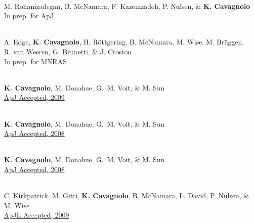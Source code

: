 \documentclass[12pt]{cv}
\begin{document}
\begin{llist}
{}\\
M. Rohanizadegan, B. McNamara, F. Kazemzadeh, P. Nulsen, \& {\bf K. Cavagnolo}\\
In prep. for ApJ

{}\\
A. Edge, {\bf{K. Cavagnolo}}, H. R\"ottgering, B. McNamara, M. Wise, M. Br\"uggen, R. van Weeren, G. Brunetti, \& J. Croston\\
In prep. for MNRAS



{}\\
{\bf K. Cavagnolo}, M. Donahue, G.~M. Voit, \& M. Sun\\
\href{http://adsabs.harvard.edu/abs/2009ApJS..182...12C}{ApJ Accepted, 2009}

{}\\
{\bf K. Cavagnolo}, M. Donahue, G.~M. Voit, \& M. Sun\\
\href{http://adsabs.harvard.edu/abs/2008ApJ...683L.107C}{ApJ Accepted, 2008}

{}\\
{\bf K. Cavagnolo}, M. Donahue, G.~M. Voit, \& M. Sun\\
\href{http://adsabs.harvard.edu/abs/2008ApJ...682..821C}{ApJ Accepted, 2008}



{}\\
C. Kirkpatrick, M. Gitti, {\bf K. Cavagnolo}, B. McNamara, L. David, P. Nulsen, \& M. Wise\\
\href{http://adsabs.harvard.edu/abs/2009arXiv0909.2252K}{ApJL Accepted, 2009}


\end{llist}
\end{document}

